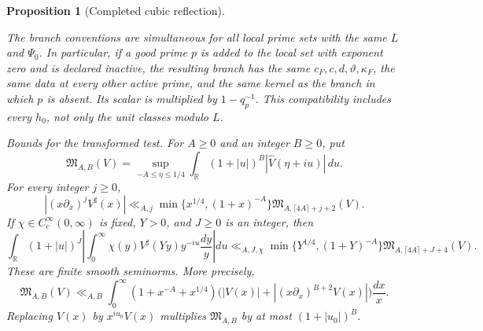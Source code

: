 \documentclass[11pt,a4paper]{article}
\numberwithin{equation}{section}
\numberwithin{figure}{section}
\newtheorem{proposition}[theorem]{Proposition}
\theoremstyle{definition}
\theoremstyle{remark}
\begin{document}
\begin{proposition}[Completed cubic reflection]
\begin{enumerate}
The branch conventions are simultaneous for all local prime sets with
the same $L$ and $\Psi_0$.  In particular, if a good prime $p$ is added
to the local set with exponent zero and is declared inactive, the resulting
branch has the same $c_F,c,d,\vartheta,\kappa_F$, the same data at every
other active prime, and the same kernel as the branch in which $p$ is absent.
Its scalar is multiplied by $1-q_p^{-1}$.  This compatibility includes every
$h_0$, not only the unit classes modulo $L$.
\end{enumerate}

\emph{Bounds for the transformed test.}
For $A\ge0$ and an integer $B\ge0$, put
\[
 \mathfrak M_{A,B}(V)=
 \sup_{-A\le\eta\le1/4}\int_{\mathbb R}
       (1+|u|)^B|\widehat V(\eta+iu)|\,du.
\]
For every integer $j\ge0$,
\begin{equation}\label{eq:reflection-kernel}
 |(x\partial_x)^jV^\sharp(x)|
 \ll_{A,j}\min\{x^{1/4},(1+x)^{-A}\}
       \mathfrak M_{A,\lceil4A\rceil+j+2}(V).
\end{equation}
If $\chi\in C_c^\infty(0,\infty)$ is fixed, $Y>0$, and $J\ge0$ is an
integer, then
\begin{equation}\label{eq:reflection-annular-fourier}
 \int_{\mathbb R}(1+|u|)^J
 \left|\int_0^\infty\chi(y)V^\sharp(Yy)y^{-iu}\frac{dy}{y}\right|du
 \ll_{A,J,\chi}\min\{Y^{1/4},(1+Y)^{-A}\}
       \mathfrak M_{A,\lceil4A\rceil+J+4}(V).
\end{equation}
These are finite smooth seminorms.  More precisely,
\begin{equation}\label{eq:reflection-test-seminorm}
 \mathfrak M_{A,B}(V)\ll_{A,B}
 \int_0^\infty(1+x^{-A}+x^{1/4})
       \bigl(|V(x)|+|(x\partial_x)^{B+2}V(x)|\bigr)\frac{dx}{x}.
\end{equation}
Replacing $V(x)$ by $x^{iu_0}V(x)$ multiplies
$\mathfrak M_{A,B}$ by at most $(1+|u_0|)^B$.
\end{proposition}
\end{document}
